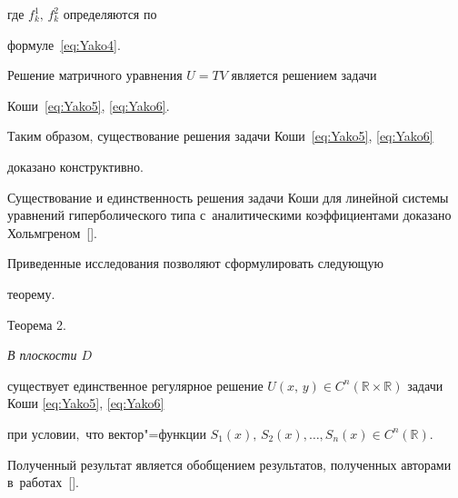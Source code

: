 где $f^{1}_{k},\,f^{2}_{k}$ определяются по

формуле~\eqref{eq:Yako4}.



Решение матричного уравнения $U=TV$ является решением  задачи

Коши~\eqref{eq:Yako5}, \eqref{eq:Yako6}.



Таким образом, существование решения задачи Коши~\eqref{eq:Yako5}, \eqref{eq:Yako6}

доказано конструктивно. 

Существование и единственность решения задачи Коши для линейной системы уравнений гиперболического типа с~аналитическими коэффициентами доказано Хольмгреном~[].







Приведенные исследования позволяют сформулировать следующую

теорему.



\smallskip

{\small\sc Теорема 2.} {\it В плоскости $D$

существует единственное регулярное решение $U\left(x,\,y\right)\in

C^{n}(\mathbb{R}\times\mathbb{R})$ задачи Коши {\rm \eqref{eq:Yako5}, \eqref{eq:Yako6}}

при условии$,$ что вектор"=функции $S_{1}(x),\,S_{2}(x),\ldots,S_{n}(x)\in C^{n}(\mathbb{R}).$

}

\smallskip



Полученный результат является обобщением результатов, полученных авторами в~работах~[].







